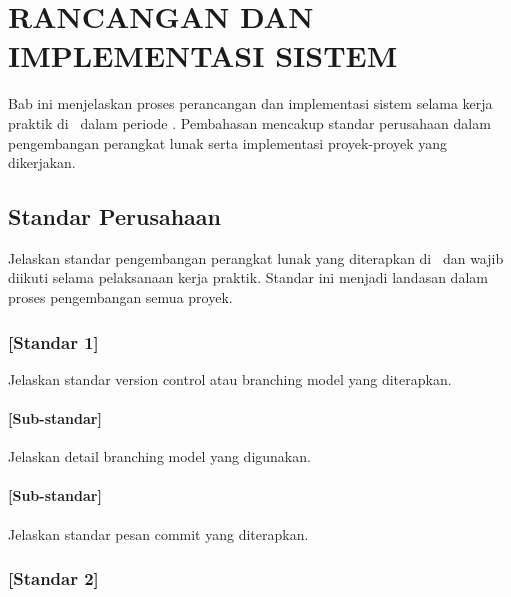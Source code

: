 \chapter{RANCANGAN DAN IMPLEMENTASI SISTEM}

Bab ini menjelaskan proses perancangan dan implementasi sistem selama kerja
praktik di \NamaPerusahaan\ dalam periode \PeriodeKP. Pembahasan mencakup
standar perusahaan dalam pengembangan perangkat lunak serta implementasi
proyek-proyek yang dikerjakan.

\section{Standar Perusahaan}

Jelaskan standar pengembangan perangkat lunak yang diterapkan di \NamaPerusahaan\
dan wajib diikuti selama pelaksanaan kerja praktik. Standar ini menjadi landasan
dalam proses pengembangan semua proyek.

\subsection{[Standar 1]}

Jelaskan standar version control atau branching model yang diterapkan.

\subsubsection{[Sub-standar]}

Jelaskan detail branching model yang digunakan.

\subsubsection{[Sub-standar]}

Jelaskan standar pesan commit yang diterapkan.

\subsection{[Standar 2]}

